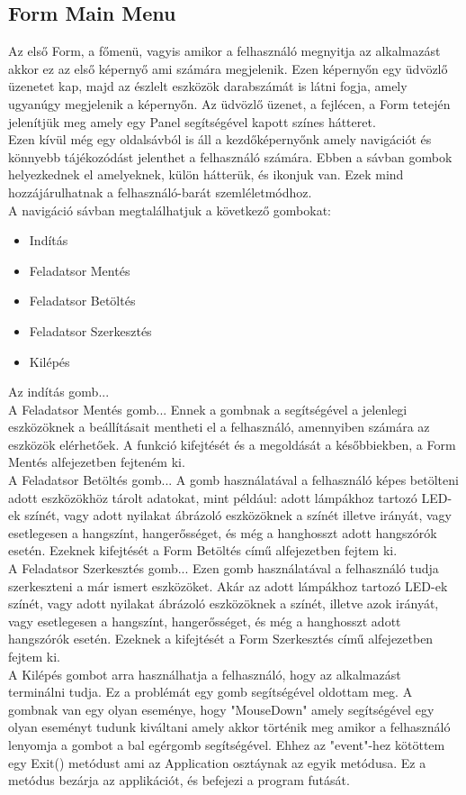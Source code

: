 \documentclass[tocnopagenum]{thesis-ekf}
\theoremstyle{definition}
\theoremstyle{remark}
\begin{document}
	\subsection*{Form Main Menu}
	Az első Form, a főmenü, vagyis amikor a felhasználó megnyitja az alkalmazást akkor ez az első képernyő ami számára megjelenik. 
	Ezen képernyőn egy üdvözlő üzenetet kap, majd az észlelt eszközök darabszámát is látni fogja, amely ugyanúgy megjelenik a képernyőn.
	Az üdvözlő üzenet, a fejlécen, a Form tetején jelenítjük meg amely egy Panel segítségével kapott színes hátteret.
	\\
	Ezen kívül még egy oldalsávból is áll a kezdőképernyőnk amely navigációt és könnyebb tájékozódást jelenthet a felhasználó számára.
	Ebben a sávban gombok helyezkednek el amelyeknek, külön hátterük, és ikonjuk van. Ezek mind hozzájárulhatnak a felhasználó-barát szemléletmódhoz.
	\\
	A navigáció sávban megtalálhatjuk a következő gombokat:
	\begin{itemize}
		\item Indítás
		\item Feladatsor Mentés
		\item Feladatsor Betöltés
		\item Feladatsor Szerkesztés
		\item Kilépés
	\end{itemize}
	Az indítás gomb...
	\\
	A Feladatsor Mentés gomb...
	Ennek a gombnak a segítségével a jelenlegi eszközöknek a beállításait mentheti el a felhasználó, amennyiben számára az eszközök elérhetőek. A funkció kifejtését és a megoldását a későbbiekben, a Form Mentés %
	alfejezetben fejteném ki.
	\\
	A Feladatsor Betöltés gomb...
	A gomb használatával a felhasználó képes betölteni adott eszközökhöz tárolt adatokat, mint például: adott lámpákhoz tartozó LED-ek színét, vagy adott nyilakat ábrázoló eszközöknek a színét illetve irányát, vagy esetlegesen a hangszínt, hangerősséget, és még a hanghosszt adott hangszórók esetén.
	Ezeknek kifejtését a Form Betöltés című 
	alfejezetben fejtem ki.
	\\
	A Feladatsor Szerkesztés gomb...
	Ezen gomb használatával a felhasználó tudja szerkeszteni a már ismert eszközöket. Akár az adott lámpákhoz tartozó LED-ek színét, vagy adott nyilakat ábrázoló eszközöknek a színét, illetve azok irányát, vagy esetlegesen a hangszínt, hangerősséget, és még a hanghosszt adott hangszórók esetén.
	Ezeknek a kifejtését a Form Szerkesztés című 
	alfejezetben fejtem ki.
	\\
	A Kilépés gombot arra használhatja a felhasználó, hogy az alkalmazást terminálni tudja. Ez a problémát egy gomb segítségével oldottam meg. A gombnak van egy olyan eseménye, hogy "MouseDown" amely segítségével egy olyan eseményt tudunk kiváltani amely akkor történik meg amikor a felhasználó lenyomja a gombot a bal egérgomb segítségével.
	Ehhez az "event"-hez kötöttem egy Exit() metódust ami az Application osztáynak az egyik metódusa. Ez a metódus bezárja az applikációt, és befejezi a program futását. 
\end{document}

